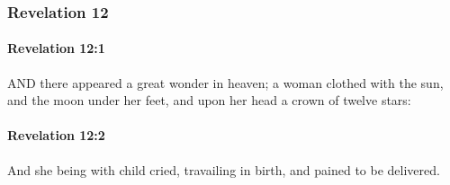 	\subsubsection{Revelation 12} %
		\label{REVELATIONNT-12}
		
		\paragraph{Revelation 12:1} %
			\label{REVELATIONNT-12-1}

			AND there appeared a great wonder in heaven; a woman clothed with the sun, and the moon under her feet, and upon her head a crown of twelve stars:

			\begin{framed}
			\scriptsize
				\begin{compactdesc}
					\item[SBLG] 
				\end{compactdesc}
			\end{framed}

		\paragraph{Revelation 12:2} %
			\label{REVELATIONNT-12-2}

			And she being with child cried, travailing in birth, and pained to be delivered.

